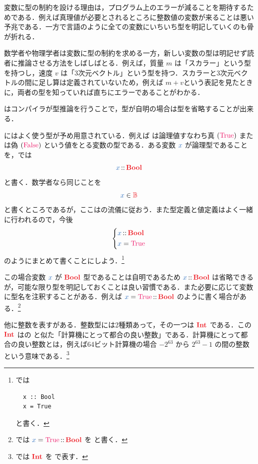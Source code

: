 \documentclass[a5paper,twoside,fleqn,draft]{jsbook}
\begin{document}
変数に型の制約を設ける理由は，プログラム上のエラーが減ることを期待するためである．例えば真理値が必要とされるところに整数値の変数が来ることは悪い予兆である．一方で\clang 言語のように全ての変数にいちいち型を明記していくのも骨が折れる．

数学者や物理学者は変数に型の制約を求める一方，新しい変数の型は明記せず読者に推論させる方法をしばしばとる．例えば，質量 $m$ は「スカラー」という型を持つし，速度 $v$ は「3次元ベクトル」という型を持つ．スカラーと3次元ベクトルの間に足し算は定義されていないため，例えば $m+v$という表記を見たときに，両者の型を知っていれば直ちにエラーであることがわかる．

\haskell はコンパイラが型推論を行うことで，型が自明の場合は型を省略することが出来る．

\separator

\haskell にはよく使う型が予め用意されている．例えば は論理値すなわち真 $(\hTrue)$ または偽 $(\hFalse)$ という値をとる変数の型である．ある変数 $\hVar{x}$ が論理型であることを，\haskell では
\begin{equation}
  \hVar{x}
  \hIsTypeOf\hBool
\end{equation}
と書く．数学者なら同じことを
\begin{equation}
  \hVar{x}
  \in\hSet{B}
\end{equation}
と書くところであるが，ここは\haskell の流儀に従おう．また型定義と値定義はよく一緒に行われるので，今後
\begin{equation}
  \left\{
  \begin{aligned}
    \hVar{x}
    &\hIsTypeOf\hBool\\
    \hVar{x}
    &=\hTrue
  \end{aligned}
  \right.
\end{equation}
のようにまとめて書くことにしよう．\footnote{\haskell では
\begin{verbatim}
  x :: Bool
  x = True
\end{verbatim}
と書く．}

この場合変数 $\hVar{x}$ が $\hBool$ 型であることは自明であるため $\hVar{x}\hIsTypeOf\hBool$ は省略できるが，可能な限り型を明記しておくことは良い習慣である．また必要に応じて変数に型名を注釈することがある．例えば $\hVar{x}=\hTrue\hIsTypeOf\hBool$ のように書く場合がある．\footnote{\haskell では $\hVar{x}=\hTrue\hIsTypeOf\hBool$ を  と書く．}

他に整数を表すがある．整数型には2種類あって，その一つは $\hInt$ である．この $\hInt$ は\clang の  と似た「計算機にとって都合の良い整数」である．計算機にとって都合の良い整数とは，例えば64ビット計算機の場合 $-2^{63}$ から $2^{63}-1$ の間の整数という意味である．\footnote{\haskell では $\hInt$ を  で表す．}
\end{document}
